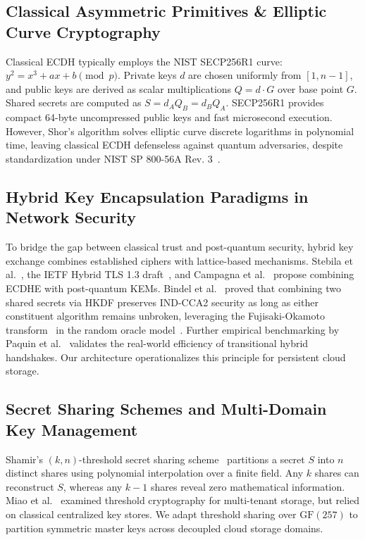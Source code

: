 \documentclass[pdflatex,sn-mathphys,Numbered]{sn-jnl}%
\theoremstyle{thmstyleone}%
\theoremstyle{thmstyletwo}%
\theoremstyle{thmstylethree}%
\begin{document}
\subsection{\textbf{Classical Asymmetric Primitives \& Elliptic Curve Cryptography}}
Classical ECDH typically employs the NIST SECP256R1 curve: $y^2 = x^3 + ax + b \pmod{p}$. Private keys $d$ are chosen uniformly from $[1, n-1]$, and public keys are derived as scalar multiplications $Q = d \cdot G$ over base point $G$. Shared secrets are computed as $S = d_A Q_B = d_B Q_A$. SECP256R1 provides compact 64-byte uncompressed public keys and fast microsecond execution. However, Shor's algorithm solves elliptic curve discrete logarithms in polynomial time, leaving classical ECDH defenseless against quantum adversaries, despite standardization under NIST SP 800-56A Rev. 3~\cite{barker2019recommendation}.

\subsection{\textbf{Hybrid Key Encapsulation Paradigms in Network Security}}
To bridge the gap between classical trust and post-quantum security, hybrid key exchange combines established ciphers with lattice-based mechanisms. Stebila et al.~\cite{stebila2016post}, the IETF Hybrid TLS 1.3 draft~\cite{stebila2023hybrid}, and Campagna et al.~\cite{campagna2020hybrid} propose combining ECDHE with post-quantum KEMs. Bindel et al.~\cite{bindel2019hybrid} proved that combining two shared secrets via HKDF preserves IND-CCA2 security as long as either constituent algorithm remains unbroken, leveraging the Fujisaki-Okamoto transform~\cite{fujisaki2013secure} in the random oracle model~\cite{bellare1993random}. Further empirical benchmarking by Paquin et al.~\cite{paquin2020benchmarking} validates the real-world efficiency of transitional hybrid handshakes. Our architecture operationalizes this principle for persistent cloud storage.

\subsection{\textbf{Secret Sharing Schemes and Multi-Domain Key Management}}
Shamir's $(k, n)$-threshold secret sharing scheme~\cite{shamir1979share} partitions a secret $S$ into $n$ distinct shares using polynomial interpolation over a finite field. Any $k$ shares can reconstruct $S$, whereas any $k-1$ shares reveal zero mathematical information. Miao et al.~\cite{miao2021optimized} examined threshold cryptography for multi-tenant storage, but relied on classical centralized key stores. We adapt threshold sharing over $\text{GF}(257)$ to partition symmetric master keys across decoupled cloud storage domains.
\end{document}
